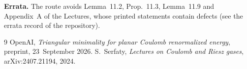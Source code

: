 \documentclass[11pt]{article}
\theoremstyle{definition}
\theoremstyle{remark}
\begin{document}
\textbf{Errata.} The route avoids Lemma~11.2, Prop.~11.3, Lemma~11.9 and Appendix~A of the Lectures, whose printed statements contain defects
(see the errata record of the repository).

\begin{thebibliography}{9}
 OpenAI, \emph{Triangular minimality for planar Coulomb renormalized energy}, preprint, 23~September 2026.
 S.~Serfaty, \emph{Lectures on Coulomb and Riesz gases}, arXiv:2407.21194, 2024.
\end{thebibliography}
\end{document}
